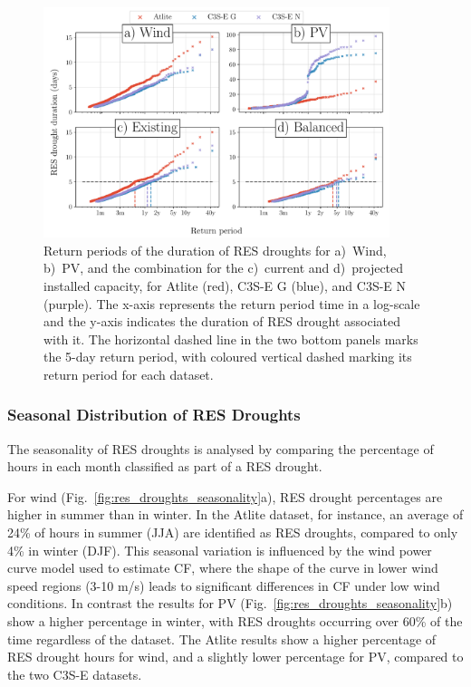 \documentclass[a4paper, 11pt]{article}
\begin{document}
\begin{figure}[!ht]
	\centering
	\includegraphics[width=0.9\textwidth]{droughts_return_periods}
	\caption{Return periods of the duration of RES droughts for a)~Wind, b)~PV, and the combination for the c)~current and d)~projected installed capacity, for Atlite (red), C3S-E G (blue), and C3S-E N (purple). The x-axis represents the return period time in a log-scale and the y-axis indicates the duration of RES drought associated with it. The horizontal dashed line in the two bottom panels marks the 5-day return period, with coloured vertical dashed marking its return period for each dataset.}
	\label{fig:return_periods}
\end{figure}

\newpage
\subsubsection{Seasonal Distribution of RES Droughts}

The seasonality of RES droughts is analysed by comparing the percentage of hours in each month classified as part of a RES drought. 

For wind (Fig.~\ref{fig:res_droughts_seasonality}a), RES drought percentages are higher in summer than in winter. In the Atlite dataset, for instance, an average of 24\% of hours in summer (JJA) are identified as RES droughts, compared to only 4\% in winter (DJF). This seasonal variation is influenced by the wind power curve model used to estimate CF, where the shape of the curve in lower wind speed regions (3-10 m/s) leads to significant differences in CF under low wind conditions. In contrast the results for PV (Fig.~\ref{fig:res_droughts_seasonality}b) show a higher percentage in winter, with RES droughts occurring over 60\% of the time regardless of the dataset. The Atlite results show a higher percentage of RES drought hours for wind, and a slightly lower percentage for PV, compared to the two C3S-E datasets. 
\end{document}
